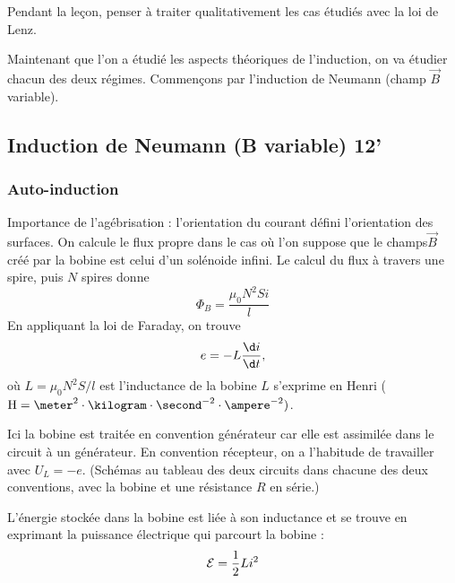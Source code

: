 Pendant la leçon, penser à traiter qualitativement les cas étudiés avec la loi de Lenz.

\begin{transition}
Maintenant que l'on a étudié les aspects théoriques de l'induction, on va étudier chacun des deux régimes.
Commençons par l'induction de Neumann (champ $\overrightarrow{B}$ variable).
\end{transition}

\subsection{Induction de Neumann (B variable) 12'}

\subsubsection{Auto-induction}


Importance de l'agébrisation : l'orientation du courant défini l'orientation des surfaces.
On calcule le flux propre dans le cas où l'on suppose que le champs$\overrightarrow{B}$ créé par la bobine est celui d'un solénoide infini.
Le calcul du flux à travers une spire, puis $N$ spires donne
\begin{equation}
\Phi_B = \frac{\mu_0 N^2 S i}{l}
\end{equation}
En appliquant la loi de Faraday, on trouve
\begin{equation}
e = -L\frac{\d i}{\d t},
\end{equation}
où $L = \mu_0 N^2 S/l$ est l'inductance de la bobine  
$L$ s'exprime en Henri ($\mathrm{H}=\meter^2\cdot\kilogram\cdot\second^{-2}\cdot\ampere^{-2})$.

Ici la bobine est traitée en convention générateur car elle est assimilée dans le circuit à un générateur.
En convention récepteur, on a l'habitude de travailler avec $U_L = -e$.
(Schémas au tableau des deux circuits dans chacune des deux conventions, avec la bobine et une résistance $R$ en série.)

L'énergie stockée dans la bobine est liée à son inductance et se trouve en exprimant la puissance électrique qui parcourt la bobine :
\begin{equation}
{\cal{E}} = \frac{1}{2}Li^2
\end{equation}

